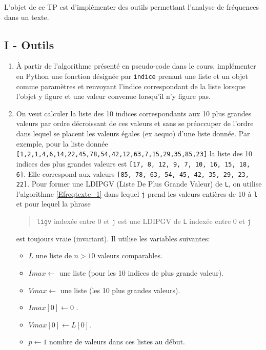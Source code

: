 L'objet de ce TP est d'implémenter des outils permettant l'analyse de fréquences dans un texte.
\subsection*{I - Outils}
\begin{enumerate}
  \item \`A partir de l'algorithme présenté en pseudo-code dans le cours, implémenter en Python une fonction désignée par \verb|indice| prenant une liste et un objet comme paramètres et renvoyant l'indice correspondant de la liste lorsque l'objet y figure et une valeur convenue lorsqu'il n'y figure pas.
  
  \item On veut calculer la liste des 10 indices correspondants aux 10 plus grandes valeurs par ordre décroissant de ces valeurs et sans se préoccuper de l'ordre dans lequel se placent les valeurs égales (ex aequo) d'une liste donnée. \newline
  Par exemple, pour la liste donnée\newline
  \verb|[1,2,1,4,6,14,22,45,78,54,42,12,63,7,15,29,35,85,23]|\newline
  la liste des 10 indices des plus grandes valeurs est\newline
  \verb|[17, 8, 12, 9, 7, 10, 16, 15, 18, 6]|. Elle correspond aux valeurs\newline
  \verb|[85, 78, 63, 54, 45, 42, 35, 29, 23, 22]|.
Pour former une LDIPGV (Liste De Plus Grande Valeur) de \texttt{L}, on utilise l'algorithme \ref{Efreqtexte_1} dans lequel \texttt{j} prend les valeurs entières de 10 à \texttt{l} et pour lequel la phrase
\begin{quote}
 \texttt{ligv} indexée entre 0 et \texttt{j} est une LDIPGV de \texttt{L} indexée entre 0 et \texttt{j}
\end{quote}
est toujours vraie (invariant). Il utilise les variables suivantes:
\begin{itemize}
  \item $L$ une liste de $n>10$ valeurs comparables.
  \item $Imax\leftarrow$ une liste (pour les 10 indices de plus grande valeur).
  \item $Vmax\leftarrow$ une liste (les 10 plus grandes valeurs).
  \item $Imax[0]\leftarrow 0$ .
  \item $Vmax[0]\leftarrow L[0]$.
  \item $p\leftarrow 1$ nombre de valeurs dans ces listes au début.

\end{itemize}
\end{enumerate}
